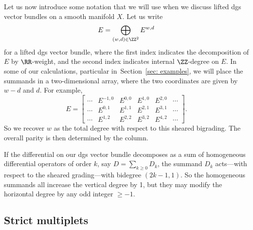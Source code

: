 Let us now introduce some notation that we will use when we discuss lifted dgs vector bundles on a smooth manifold $X$. Let us write
\begin{equation*}
E = \bigoplus_{(w,d) \in \ZZ^2} E^{w,d}
\end{equation*}
for a lifted dgs vector bundle, where the first index indicates the decomposition of $E$ by $\RR$-weight, and the second index indicates internal $\ZZ$-degree on $E$. In some of our calculations, particular in~Section~\ref{sec: examples}, we will place the summands in a two-dimensional array, where the two coordinates are given by $w-d$ and $d$. For example,
\begin{equation*}
E =
\begin{bmatrix}
\cdots &E^{-1,0} &E^{0,0} &E^{1,0} &E^{2,0}&\cdots\\
\cdots &E^{0,1} &E^{1,1} &E^{2,1} &E^{3,1}&\cdots\\
\cdots &E^{1,2} &E^{2,2} &E^{3,2} &E^{4,2} &\cdots
\end{bmatrix}.
\end{equation*}
So we recover $w$ as the total degree with respect to this sheared bigrading. The overall parity is then determined by the column.

If the differential on our dgs vector bundle decomposes as a sum of homogeneous differential operators of order $k$, say $D = \sum_{k \ge 0} D_k$, the summand $D_k$ acts---with respect to the sheared grading---with bidegree $(2k-1, 1)$. So the homogeneous summands all increase the vertical degree by 1, but they may modify the horizontal degree by any odd integer $\ge -1$.

\subsection{Strict multiplets}

